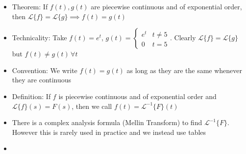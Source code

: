 \documentclass{article}
\begin{document}
\begin{itemize}
    \item Theorem: If $f(t), g(t)$ are piecewise continuous and of exponential order, then $\mathcal{L} \{f\} = \mathcal{L} \{g\} \implies f(t) = g(t)$
    \item Technicality: Take $f(t) = e^t$, $g(t) = \begin{cases} 
        e^t & t \neq 5 \\
        0 & t = 5  
     \end{cases}$. Clearly $\mathcal{L} \{f\} = \mathcal{L} \{g\}$ but $f(t) \neq g(t) \, \forall t$
     \item Convention: We write $f(t) = g(t)$ as long as they are the same whenever they are continuous
     \item Definition: If $f$ is piecewise continuous and of exponential order and $\mathcal{L} \{f\} (s) = F(s)$, then we call $f(t) = \mathcal{L}^{-1} \{F\} (t)$
     \item There is a complex analysis formula (Mellin Transform) to find $\mathcal{L}^{-1} \{F\}$. However this is rarely used in practice and we instead use tables
     \item 
\end{itemize}
\end{document}
